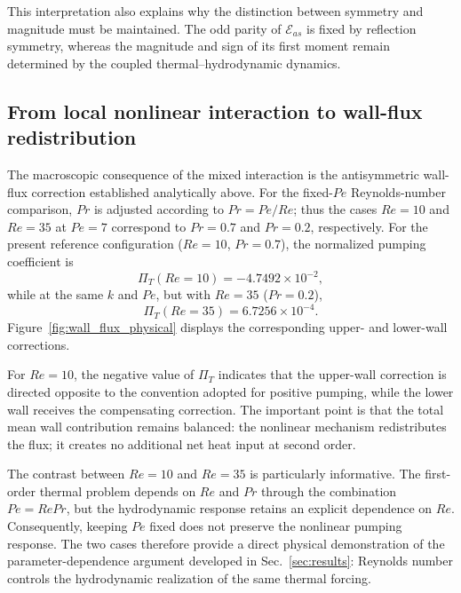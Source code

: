 \documentclass[12pt,a4paper]{article}
\newcommand{\Rey}{\mathit{Re}}
\newcommand{\Pe}{\mathit{Pe}}
\renewcommand{\Pr}{\mathit{Pr}}
\newcommand{\PiT}{\Pi_T}
\begin{document}
This interpretation also explains why the distinction between symmetry and
magnitude must be maintained. The odd parity of $\mathcal{E}_{as}$ is fixed
by reflection symmetry, whereas the magnitude and sign of its first moment
remain determined by the coupled thermal--hydrodynamic dynamics.

\subsection{From local nonlinear interaction to wall-flux redistribution}
\label{subsec:wall_flux_rectification}

The macroscopic consequence of the mixed interaction is the antisymmetric
wall-flux correction established analytically above. For the fixed-$\Pe$
Reynolds-number comparison, $\Pr$ is adjusted according to $\Pr=\Pe/\Rey$;
thus the cases $\Rey=10$ and $\Rey=35$ at $\Pe=7$ correspond to $\Pr=0.7$
and $\Pr=0.2$, respectively. For the present
reference configuration ($\Rey=10$, $\Pr=0.7$), the normalized pumping coefficient is
\begin{equation}
\PiT(\Rey=10)
=-4.7492\times10^{-2},
\end{equation}
while at the same $k$ and $\Pe$, but with $\Rey=35$ ($\Pr=0.2$),
\begin{equation}
\PiT(\Rey=35)
=6.7256\times10^{-4}.
\end{equation}
Figure~\ref{fig:wall_flux_physical} displays the corresponding upper- and
lower-wall corrections.

For $\Rey=10$, the negative value of $\PiT$ indicates that the upper-wall
correction is directed opposite to the convention adopted for positive
pumping, while the lower wall receives the compensating correction. The
important point is that the total mean wall contribution remains balanced:
the nonlinear mechanism redistributes the flux; it creates no
additional net heat input at second order.

The contrast between $\Rey=10$ and $\Rey=35$ is particularly informative.
The first-order thermal problem depends on $\Rey$ and $\Pr$ through the
combination $\Pe=\Rey\Pr$, but the hydrodynamic response retains an explicit
dependence on $\Rey$. Consequently, keeping $\Pe$ fixed does not preserve
the nonlinear pumping response. The two cases therefore provide a direct
physical demonstration of the parameter-dependence argument developed in
Sec.~\ref{sec:results}: Reynolds number controls the hydrodynamic realization
of the same thermal forcing.
\end{document}
